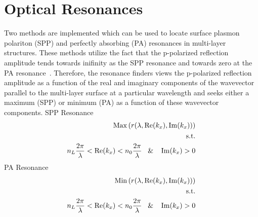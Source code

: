 \documentclass[journal=jpclcd,manuscript=suppinfo]{achemso}
\begin{document}
\section{Optical Resonances}
Two methods are implemented which can be used to locate surface plasmon polariton (SPP) and perfectly absorbing (PA) resonances
in multi-layer structures.  These methods utilize the fact that the p-polarized reflection amplitude tends towards inifinity 
as the SPP resonance and towards zero at the PA resonance~\cite{FHR_SciRep_2015}.  
Therefore, the resonance finders views the p-polarized reflection amplitude
as a function of the real and imaginary components of the wavevector parallel to the multi-layer surface at a particular wavelength 
and seeks either a maximum (SPP) or minimum (PA) as a function of these wavevector components.
\newline
SPP Resonance
\begin{align}
{\rm Max}\left( r (\lambda, {\rm Re}(k_x), {\rm Im}(k_x))\right) \\
{\rm s.t.} \\
n_L \frac{2\pi}{\lambda} < {\rm Re}(k_x) < n_0  \frac{2\pi}{\lambda} \; \; \; \& \; \; \; \; {\rm Im}(k_x) > 0
\end{align}
\newline
PA Resonance
\begin{align}
{\rm Min}\left( r (\lambda, {\rm Re}(k_x), {\rm Im}(k_x))\right) \\
{\rm s.t.} \\
n_L \frac{2\pi}{\lambda} < {\rm Re}(k_x) < n_0  \frac{2\pi}{\lambda} \; \; \; \& \; \; \; \; {\rm Im}(k_x) > 0
\end{align}

\end{document}

